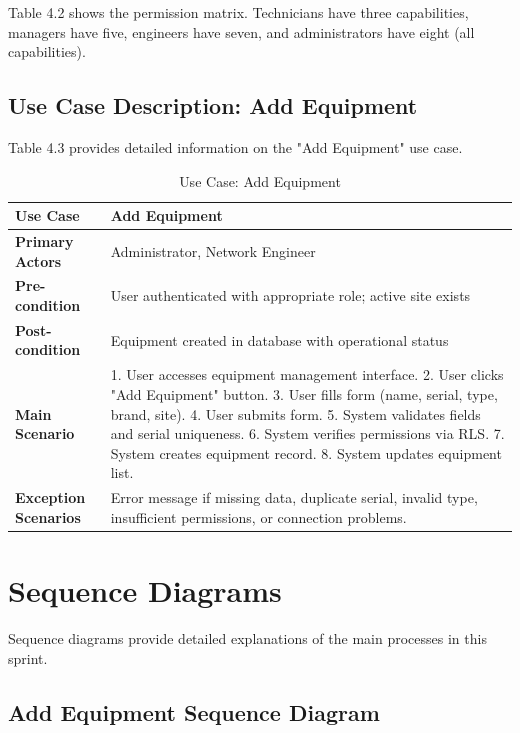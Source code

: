 Table 4.2 shows the permission matrix. Technicians have three capabilities, managers have five, engineers have seven, and administrators have eight (all capabilities).

\subsection{Use Case Description: Add Equipment}

Table 4.3 provides detailed information on the "Add Equipment" use case.

\begin{table}[H]
\centering
\small
\begin{tabular}{|p{3cm}|p{7.5cm}|}
\hline
\textbf{Use Case} & Add Equipment \\
\hline
\textbf{Primary Actors} & Administrator, Network Engineer \\
\hline
\textbf{Pre-condition} & User authenticated with appropriate role; active site exists \\
\hline
\textbf{Post-condition} & Equipment created in database with operational status \\
\hline
\textbf{Main Scenario} & 
1. User accesses equipment management interface.
2. User clicks "Add Equipment" button.
3. User fills form (name, serial, type, brand, site).
4. User submits form.
5. System validates fields and serial uniqueness.
6. System verifies permissions via RLS.
7. System creates equipment record.
8. System updates equipment list.
\\
\hline
\textbf{Exception Scenarios} & 
Error message if missing data, duplicate serial, invalid type, insufficient permissions, or connection problems.
\\
\hline
\end{tabular}
\caption{Use Case: Add Equipment}
\label{tab:add_equipment_usecase}
\end{table}

\section{Sequence Diagrams}

Sequence diagrams provide detailed explanations of the main processes in this sprint.

\subsection{Add Equipment Sequence Diagram}

